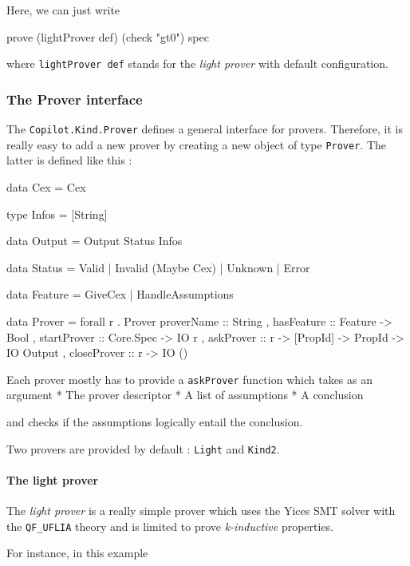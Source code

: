 Here, we can just write
\begin{code}
prove (lightProver def) (check "gt0") spec
\end{code}

where \texttt{lightProver def} stands for the \emph{light prover} with
default configuration.

\subsubsection{The Prover interface}\label{the-prover-interface}

The \texttt{Copilot.Kind.Prover} defines a general interface for
provers. Therefore, it is really easy to add a new prover by creating a
new object of type \texttt{Prover}. The latter is defined like this :

\begin{code}
data Cex = Cex

type Infos = [String]

data Output = Output Status Infos

data Status
  = Valid
  | Invalid (Maybe Cex)
  | Unknown
  | Error
  
data Feature = GiveCex | HandleAssumptions
  
data Prover = forall r . Prover 
  { proverName     :: String
  , hasFeature     :: Feature -> Bool
  , startProver    :: Core.Spec -> IO r
  , askProver      :: r -> [PropId] -> PropId -> IO Output 
  , closeProver    :: r -> IO () 
  }

\end{code}

Each prover mostly has to provide a \texttt{askProver} function which
takes as an argument * The prover descriptor * A list of assumptions * A
conclusion

and checks if the assumptions logically entail the conclusion.

Two provers are provided by default : \texttt{Light} and \texttt{Kind2}.

\paragraph{The light prover}\label{the-light-prover}

The \emph{light prover} is a really simple prover which uses the Yices
SMT solver with the \texttt{QF\_UFLIA} theory and is limited to prove
\emph{k-inductive} properties.

For instance, in this example


